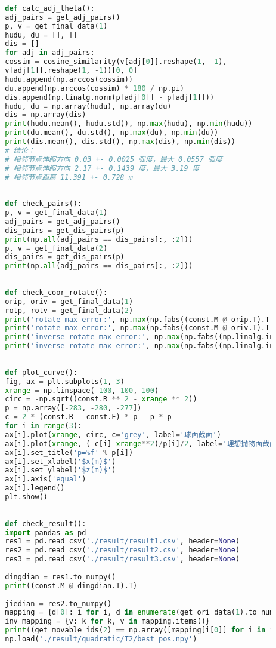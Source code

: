\documentclass[withoutpreface,bwprint,fontset=macnew]{cumcmthesis} %
\begin{document}
\begin{appendices}
\begin{lstlisting}[language=python]
		
		def calc_adj_theta():
		adj_pairs = get_adj_pairs()
		p, v = get_final_data(1)
		hudu, du = [], []
		dis = []
		for adj in adj_pairs:
		cossim = cosine_similarity(v[adj[0]].reshape(1, -1),
		v[adj[1]].reshape(1, -1))[0, 0]
		hudu.append(np.arccos(cossim))
		du.append(np.arccos(cossim) * 180 / np.pi)
		dis.append(np.linalg.norm(p[adj[0]] - p[adj[1]]))
		hudu, du = np.array(hudu), np.array(du)
		dis = np.array(dis)
		print(hudu.mean(), hudu.std(), np.max(hudu), np.min(hudu))
		print(du.mean(), du.std(), np.max(du), np.min(du))
		print(dis.mean(), dis.std(), np.max(dis), np.min(dis))
		# 结论：
		# 相邻节点伸缩方向 0.03 +- 0.0025 弧度，最大 0.0557 弧度
		# 相邻节点伸缩方向 2.17 +- 0.1439 度，最大 3.19 度
		# 相邻节点距离 11.391 +- 0.728 m
		
		
		def check_pairs():
		p, v = get_final_data(1)
		adj_pairs = get_adj_pairs()
		dis_pairs = get_dis_pairs(p)
		print(np.all(adj_pairs == dis_pairs[:, :2]))
		p, v = get_final_data(2)
		dis_pairs = get_dis_pairs(p)
		print(np.all(adj_pairs == dis_pairs[:, :2]))
		
		
		def check_coor_rotate():
		orip, oriv = get_final_data(1)
		rotp, rotv = get_final_data(2)
		print('rotate max error:', np.max(np.fabs((const.M @ orip.T).T - rotp)))
		print('rotate max error:', np.max(np.fabs((const.M @ oriv.T).T - rotv)))
		print('inverse rotate max error:', np.max(np.fabs((np.linalg.inv(const.M) @ rotp.T).T - orip)))
		print('inverse rotate max error:', np.max(np.fabs((np.linalg.inv(const.M) @ rotv.T).T - oriv)))
		
		
		def plot_curve():
		fig, ax = plt.subplots(1, 3)
		xrange = np.linspace(-100, 100, 100)
		circ = -np.sqrt((const.R ** 2 - xrange ** 2))
		p = np.array([-283, -280, -277])
		c = 2 * (const.R - const.F) * p - p * p
		for i in range(3):
		ax[i].plot(xrange, circ, c='grey', label='球面截面')
		ax[i].plot(xrange, (-c[i]-xrange**2)/p[i]/2, label='理想抛物面截面')
		ax[i].set_title('p=%f' % p[i])
		ax[i].set_xlabel('$x(m)$')
		ax[i].set_ylabel('$z(m)$')
		ax[i].axis('equal')
		ax[i].legend()
		plt.show()
		
		
		def check_result():
		import pandas as pd
		res1 = pd.read_csv('./result/result1.csv', header=None)
		res2 = pd.read_csv('./result/result2.csv', header=None)
		res3 = pd.read_csv('./result/result3.csv', header=None)
		
		dingdian = res1.to_numpy()
		print((const.M @ dingdian.T).T)
		
		jiedian = res2.to_numpy()
		mapping = {d[0]: i for i, d in enumerate(get_ori_data(1).to_numpy())}
		inv_mapping = {v: k for k, v in mapping.items()}
		print((get_movable_ids(2) == np.array([mapping[i[0]] for i in jiedian])).all())
		np.load('./result/quadratic/T2/best_pos.npy')
		

\end{lstlisting}
\end{appendices}
\end{document}
